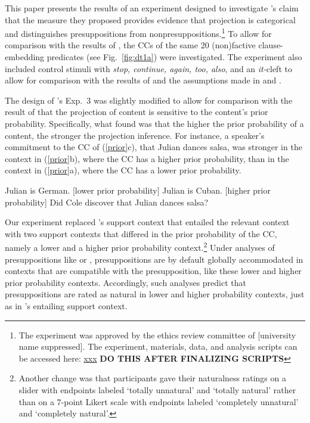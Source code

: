 \documentclass[11pt,fleqn]{article}
\newcommand{\6}{\mbox{$[\hspace*{-.6mm}[$}}
\newcommand{\9}{\mbox{$]\hspace*{-.6mm}]$}}
\newcommand{\citepos}[1]{\citeauthor{#1}'s \citeyear{#1}}
\begin{document}
This paper presents the results of an experiment designed to investigate \citepos{mandelkern-etal2020} claim that the measure they proposed provides evidence that projection is categorical and distinguishes presuppositions from nonpresuppositions.\footnote{\label{f:github}The experiment was approved by the ethics review committee of [university name suppressed]. The experiment, materials, data, and analysis scripts can be accessed here:  \url{xxx} {\bf DO THIS AFTER FINALIZING SCRIPTS}}  To allow for comparison with the results of \citealt{degen-tonhauser-language}, the CCs of the same 20 (non)factive clause-embedding predicates (see Fig.~\ref{fig:dt1a}) were investigated. The experiment also included control stimuli with {\em stop, continue, again, too, also}, and an {\em it-}cleft to allow for comparison with the results of \citealt{mandelkern-etal2020} and the assumptions made in \citealt{simons01} and \citealt{abusch10}. 

The design of \citepos{mandelkern-etal2020} Exp.~3 was slightly modified to allow for comparison with the result of \citealt{degen-tonhauser-openmind} that the projection of content is sensitive to the content's prior probability. Specifically, what \citealt{degen-tonhauser-openmind} found was that the higher the prior probability of a content, the stronger the projection inference. For instance, a speaker's commitment to the CC of (\ref{prior}c), that Julian dances salsa, was stronger in the context in (\ref{prior}b), where the CC has a higher prior probability, than in the context in (\ref{prior}a), where the CC has a lower prior probability.

\begin{exe}
\ex\label{prior}
\begin{xlist}
\ex Julian is German. \hfill [lower prior probability]
\ex Julian is Cuban. \hfill [higher prior probability]
\ex Did Cole discover that Julian dances salsa?
\end{xlist}
\end{exe}
Our experiment replaced \citepos{mandelkern-etal2020} support context that entailed the relevant context with two support contexts that differed in the prior probability of the CC, namely a lower and a higher prior probability context.\footnote{Another change was that participants gave their naturalness ratings on a slider with endpoints labeled `totally unnatural' and `totally natural' rather than on a 7-point Likert scale with endpoints labeled `completely unnatural' and `completely natural'.}  Under analyses of presuppositions like \citealt{heim83} or \citealt{vds92}, presuppositions are by default globally accommodated in contexts that are compatible with the presupposition, like these lower and higher prior probability contexts. Accordingly, such analyses predict that presuppositions are rated as natural in lower and higher probability contexts, just as in \citepos{mandelkern-etal2020} entailing support context. 
\end{document}
